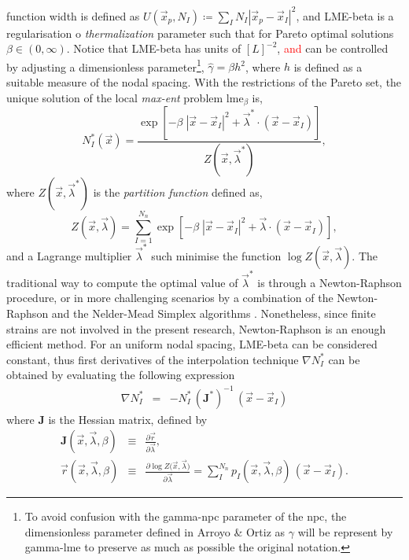 \documentclass[preprint,12pt,a4paper]{elsarticle}
\newcommand{\tens}[1]{
  \ensuremath{\mathbf{{#1}}}
}
\begin{document}
function width is defined as $U(\vec{x}_p,N_I) \coloneqq \sum_I N_I |\vec{x}_p - \vec{x}_I |^2$, and \gls{LME-beta} is a regularisation o \textit{thermalization} parameter such that for
Pareto optimal solutions $\beta \in
(0,\infty)$. Notice that \gls{LME-beta} has units of $[L]^{-2}$,
\textcolor{red}{and} can be controlled by adjusting a dimensionless
parameter\footnote{To avoid confusion with the \gls{gamma-npc} parameter of
  the \acrshort{npc}, the dimensionless parameter defined in Arroyo \&
  Ortiz \cite{Arroyo2006} as $\gamma$ will be represent by
  \gls{gamma-lme} to preserve as much as possible the original notation.},
$\widehat{\gamma}=\beta h^2$, where $h$ is defined as a
suitable measure of the nodal spacing. With the restrictions of the
Pareto set, the unique solution of the local
\textit{max-ent} problem \acrshort{lme}$_\beta$ is,
 \begin{equation}
  \label{eq:LME-p}
N_I^*(\vec{x})=\frac{\exp\left[ -\beta \; |\vec{x}-\vec{x}_I|^2 +
    \vec{\lambda}^* \cdot (\vec{x}-\vec{x}_I) \right] } {Z(\vec{x},\vec{\lambda}^*)},
\end{equation}
where $Z(\vec{x},\vec{\lambda}^*)$ is the \textit{partition function} defined as,
\begin{equation}
  \label{eq:LME-Z}
Z(\vec{x}, {\vec{\lambda}}) = \sum_{I=1}^{N_n}{ \exp \left[ -\beta \; |\vec{x}-\vec{x}_I|^2 + \vec{\lambda} \cdot (\vec{x}-\vec{x}_I)  \right]},
\end{equation}
and a Lagrange multiplier $\vec{\lambda}^*$ such minimise the function $\log
Z(\vec{x}, \vec{\lambda})$.
The traditional way to compute the optimal value of $\vec{\lambda}^*$
is through a Newton-Raphson procedure, or in more challenging
scenarios by a combination of the Newton-Raphson and the Nelder-Mead
Simplex algorithms \cite{Navas2018a}. Nonetheless, since finite
strains are not involved in the present research, Newton-Raphson is an
enough efficient method. For an uniform nodal spacing, \gls{LME-beta} can be
considered constant, thus first derivatives of the interpolation technique $\nabla
N^*_I$ can be obtained 
by evaluating the following expression
\begin{eqnarray}
  \label{eq:LME-gradp} 
\nabla N^*_I &=& -N^*_I \,  (\tens{J}^*)^{-1} \,  (\vec{x} - \vec{x}_I)
\end{eqnarray}
where $\tens{J}$ is the Hessian matrix, defined by
\begin{eqnarray}
  \label{eq:LME-J} 
  \tens{J}(\vec{x}, \vec{\lambda},\beta) &\equiv& \frac{\partial
                                                  \vec{r}}{\partial \vec{\lambda}},\\
  \label{eq:LME-r}
  \vec{r}(\vec{x},\vec{\lambda},\beta) &\equiv& \frac{\partial \log{ Z(   \vec{x},\vec{\lambda}})}{\partial \vec{\lambda}}  = \sum_I^{N_n} p_I(\vec{x},\vec{\lambda},\beta) \, (\vec{x} - \vec{x}_I).
\end{eqnarray}
\end{document}
